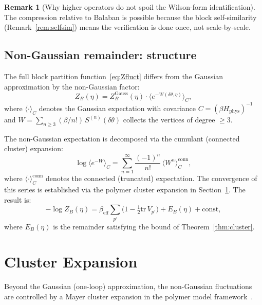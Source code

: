 \documentclass[11pt]{article}
\theoremstyle{definition}
\newtheorem{remark}[theorem]{Remark}
\newcommand{\tr}{\mathrm{tr}}
\begin{document}
\begin{remark}[Why higher operators do not spoil the Wilson-form identification]
The compression relative to Balaban is possible because the block
self-similarity (Remark~\ref{rem:selfsim}) means the verification
is done once, not scale-by-scale.
\end{remark}

\subsection{Non-Gaussian remainder: structure}\label{subsec:nongauss}

The full block partition function~\eqref{eq:Zfluct} differs from the
Gaussian approximation by the non-Gaussian factor:
\begin{equation}\label{eq:NG}
Z_B(\eta)=Z_B^{\mathrm{Gauss}}(\eta)\cdot
\bigl\langle e^{-W(\delta\theta,\eta)}\bigr\rangle_C,
\end{equation}
where $\langle\cdot\rangle_C$ denotes the Gaussian expectation with
covariance $C=(\beta H_{\mathrm{phys}})^{-1}$ and
$W=\sum_{n\ge 3}(\beta/n!)\,S^{(n)}(\delta\theta)$ collects the
vertices of degree $\ge 3$.

The non-Gaussian expectation is decomposed via the cumulant (connected
cluster) expansion:
\begin{equation}\label{eq:cumulant}
\log\bigl\langle e^{-W}\bigr\rangle_C
=\sum_{n=1}^\infty\frac{(-1)^n}{n!}\,\langle W^n\rangle_C^{\mathrm{conn}},
\end{equation}
where $\langle\cdot\rangle_C^{\mathrm{conn}}$ denotes the connected
(truncated) expectation.  The convergence of this series is established
via the polymer cluster expansion in Section~\ref{sec:cluster}.  The
result is:
\begin{equation}
-\log Z_B(\eta)=\beta_{\mathrm{eff}}\sum_{p'}
\bigl(1-\tfrac{1}{2}\tr\,V_{p'}\bigr)
+E_B(\eta)+\text{const},
\end{equation}
where $E_B(\eta)$ is the remainder satisfying the bound of
Theorem~\ref{thm:cluster}.

\section{Cluster Expansion}\label{sec:cluster}

Beyond the Gaussian (one-loop) approximation, the non-Gaussian
fluctuations are controlled by a Mayer cluster expansion in the
polymer model framework~\cite{Brydges86,KP}.
\end{document}

